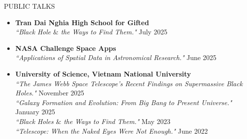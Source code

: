 \documentclass{resume} %
\begin{document}
\begin{rSection}{PUBLIC TALKS}
\begin{itemize}
    \item \textbf{Tran Dai Nghia High School for Gifted}\\
    \textit{``Black Hole $\&$ the Ways to Find Them."} \hfill July 2025
    
    \item \textbf{NASA Challenge Space Apps}\\
    \textit{``Applications of Spatial Data in Astronomical Research."} \hfill June 2025 
    
    \item \textbf{University of Science, Vietnam National University}\\
    \textit{``The James Webb Space Telescope's Recent Findings on Supermassive Black Holes."} \hfill November 2025 \\
    \textit{``Galaxy Formation and Evolution: From Big Bang to Present Universe."} \hfill January 2025 \\
    \textit{``Black Holes $\&$ the Ways to Find Them."} \hfill May 2023 \\
    \textit{``Telescope: When the Naked Eyes Were Not Enough."} \hfill June 2022 
    

    
\end{itemize}
\end{rSection}
\end{document}
